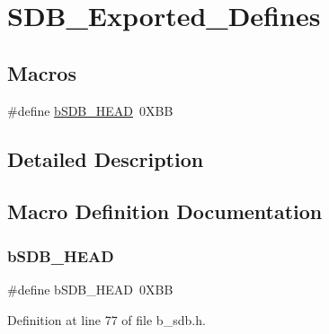 \hypertarget{group___s_d_b___exported___defines}{}\section{S\+D\+B\+\_\+\+Exported\+\_\+\+Defines}
\label{group___s_d_b___exported___defines}
\subsection*{Macros}
\begin{DoxyCompactItemize}
\item 
\#define \mbox{\hyperlink{group___s_d_b___exported___defines_ga0bc56614d05360d0bb719e399dd6557f}{b\+S\+D\+B\+\_\+\+H\+E\+AD}}~0\+X\+BB
\end{DoxyCompactItemize}


\subsection{Detailed Description}


\subsection{Macro Definition Documentation}
\mbox{\label{group___s_d_b___exported___defines_ga0bc56614d05360d0bb719e399dd6557f}} 
\subsubsection{\texorpdfstring{b\+S\+D\+B\+\_\+\+H\+E\+AD}{bSDB\_HEAD}}
{\footnotesize\ttfamily \#define b\+S\+D\+B\+\_\+\+H\+E\+AD~0\+X\+BB}



Definition at line 77 of file b\+\_\+sdb.\+h.

